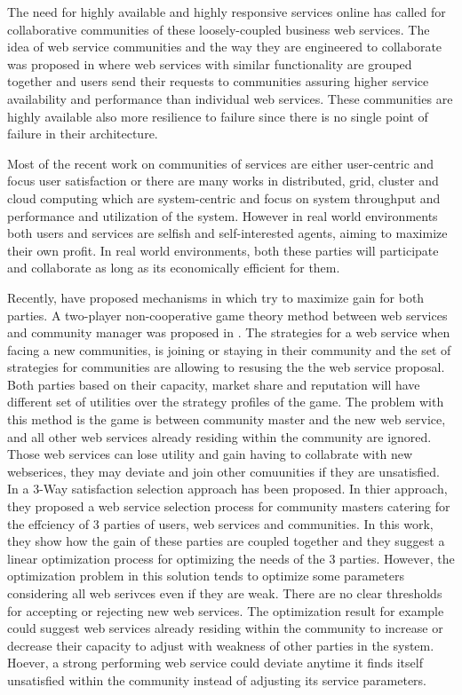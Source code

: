 \documentclass[10pt, conference, compsocconf]{IEEEtran}
\theoremstyle{plain}
\theoremstyle{definition}
\begin{document}
The need for highly available and highly responsive services online has called for collaborative communities of these loosely-coupled business web services. The idea of web service communities and the way they are engineered to collaborate was proposed in \cite{DBLP:journals/ijebr/MaamarSTBB09, DBLP:journals/internet/BenatallahSD03, Rosario:2008:PQS:1512146.1512290} where web services with similar functionality are grouped together and users send their requests to communities assuring higher service availability and performance than individual web services. These communities are highly available also more resilience to failure since there is no single point of failure in their architecture. 

Most of the recent work on communities of services are either user-centric and focus user satisfaction \cite{Chun02user-centricperformance} or there are many works in distributed, grid, cluster and cloud computing which are system-centric and focus on system throughput and performance and utilization of the system. However in real world environments both users and services are selfish and self-interested agents, aiming to maximize their own profit. In real world environments, both these parties will participate and collaborate as long as its economically efficient for them. 

Recently, \cite{DBLP:conf/IEEEscc/LimTMB12, DBLP:conf/IEEEscc/KhosravifarABT11} have proposed mechanisms in which try to maximize gain for both parties. A two-player non-cooperative game theory method between web services and community manager was proposed in \cite{DBLP:conf/IEEEscc/KhosravifarABT11}. The strategies for a web service when facing a new communities, is joining or staying in their community and the set of strategies for communities are allowing to resusing the the web service proposal. Both parties based on their capacity, market share and reputation will have different set of utilities over the strategy profiles of the game. The problem with this method is the game is between community master and the new web service, and all other web services already residing within the community are ignored. Those web services can lose utility and gain having to collabrate with new webserices, they may deviate and join other comuunities if they are unsatisfied. In \cite{DBLP:conf/IEEEscc/LimTMB12} a 3-Way satisfaction selection approach has been proposed. In thier approach, they proposed a web service selection process for community masters catering for the effciency of 3 parties of users, web services and communities. In this work, they show how the gain of these parties are coupled together and they suggest a linear optimization process for optimizing the needs of the 3 parties. However, the optimization problem in this solution tends to optimize some parameters considering all web serivces even if they are weak. There are no clear thresholds for accepting or rejecting new web services. The optimization result for example could suggest web services already residing within the community to increase or decrease their capacity to adjust with weakness of other parties in the system. Hoever, a strong performing web service could deviate anytime it finds itself unsatisfied within the community instead of adjusting its service parameters. 
\end{document}
